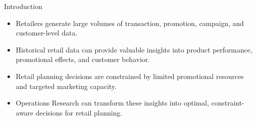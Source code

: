 \documentclass[aspectratio=169,10pt]{beamer}
\begin{document}
\begin{frame}{Introduction}

\vspace{0.35cm}

\begin{itemize}

    \item Retailers generate large volumes of transaction, promotion,
    campaign, and customer-level data.

    \vspace{0.35cm}

    \item Historical retail data can provide valuable insights into
    product performance, promotional effects, and customer behavior.

    \vspace{0.35cm}

    \item Retail planning decisions are constrained by limited
    promotional resources and targeted marketing capacity.

    \vspace{0.35cm}

    \item Operations Research can transform these insights into
    optimal, constraint-aware decisions for retail planning.

\end{itemize}

\end{frame}
\end{document}
